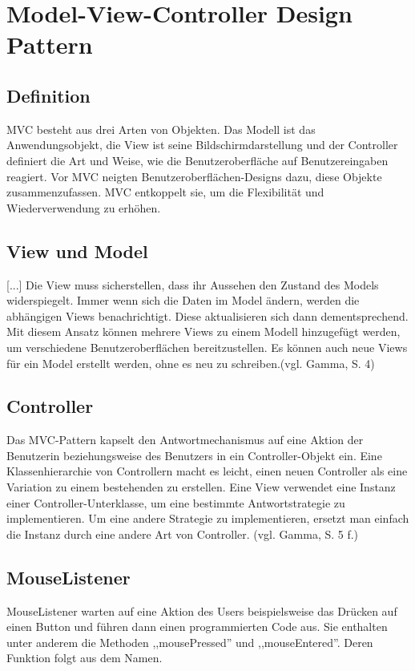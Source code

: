 \documentclass[12pt]{report}
\begin{document}
  
\section{Model-View-Controller Design Pattern}
 
\subsection{Definition}
MVC besteht aus drei Arten von Objekten. Das Modell ist das Anwendungsobjekt, die View ist seine Bildschirmdarstellung und der Controller definiert die Art und Weise, wie die Benutzeroberfläche auf Benutzereingaben reagiert. Vor MVC neigten Benutzeroberflächen-Designs dazu, diese Objekte zusammenzufassen. MVC entkoppelt sie, um die Flexibilität und Wiederverwendung zu erhöhen.

\subsection{View und Model}
[...] Die View muss sicherstellen, dass ihr Aussehen den Zustand des Models widerspiegelt. Immer wenn sich die Daten im Model ändern, werden die abhängigen Views benachrichtigt. Diese aktualisieren sich dann dementsprechend. Mit diesem Ansatz können mehrere Views zu einem Modell hinzugefügt werden, um verschiedene Benutzeroberflächen bereitzustellen. Es können auch neue Views für ein Model erstellt werden, ohne es neu zu schreiben.(vgl. Gamma, S. 4\nocite{DPGOF})\\

\subsection{Controller}
Das MVC-Pattern kapselt den Antwortmechanismus auf eine Aktion der Benutzerin beziehungsweise des Benutzers in ein Controller-Objekt ein. Eine Klassenhierarchie von Controllern macht es leicht, einen neuen Controller als eine Variation zu einem bestehenden zu erstellen.
\noindent Eine View verwendet eine Instanz einer Controller-Unterklasse, um eine bestimmte Antwortstrategie zu implementieren. Um eine andere Strategie zu implementieren, ersetzt man einfach die Instanz durch eine andere Art von Controller. (vgl. Gamma, S. 5 f.\nocite{DPGOF})\\

\subsection{MouseListener}
MouseListener warten auf eine Aktion des Users beispielsweise das Drücken auf einen Button und führen dann einen programmierten Code aus. Sie enthalten unter anderem die Methoden ,,mousePressed'' und ,,mouseEntered''. Deren Funktion folgt aus dem Namen.
\end{document}
